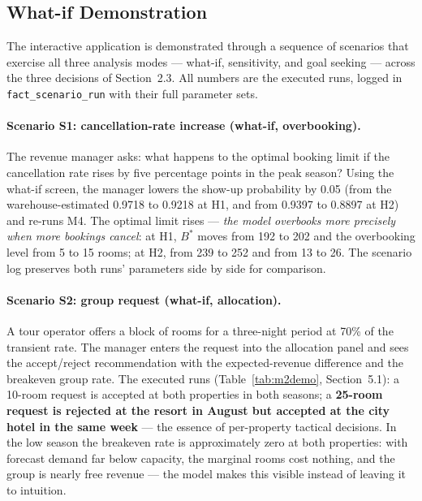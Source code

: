 \subsection{What-if Demonstration}

The interactive application is demonstrated through a sequence of scenarios that exercise all three analysis modes --- what-if, sensitivity, and goal seeking --- across the three decisions of Section~2.3. All numbers are the executed runs, logged in \texttt{fact\_scenario\_run} with their full parameter sets.

\paragraph{Scenario S1: cancellation-rate increase (what-if, overbooking).}
The revenue manager asks: what happens to the optimal booking limit if the cancellation rate rises by five percentage points in the peak season? Using the what-if screen, the manager lowers the show-up probability by 0.05 (from the warehouse-estimated 0.9718 to 0.9218 at H1, and from 0.9397 to 0.8897 at H2) and re-runs M4. The optimal limit rises --- \emph{the model overbooks more precisely when more bookings cancel}: at H1, $B^{*}$ moves from 192 to 202 and the overbooking level from 5 to 15 rooms; at H2, from 239 to 252 and from 13 to 26. The scenario log preserves both runs' parameters side by side for comparison.

\paragraph{Scenario S2: group request (what-if, allocation).}
A tour operator offers a block of rooms for a three-night period at 70\% of the transient rate. The manager enters the request into the allocation panel and sees the accept/reject recommendation with the expected-revenue difference and the breakeven group rate. The executed runs (Table~\ref{tab:m2demo}, Section~5.1): a 10-room request is accepted at both properties in both seasons; a \textbf{25-room request is rejected at the resort in August but accepted at the city hotel in the same week} --- the essence of per-property tactical decisions. In the low season the breakeven rate is approximately zero at both properties: with forecast demand far below capacity, the marginal rooms cost nothing, and the group is nearly free revenue --- the model makes this visible instead of leaving it to intuition.

